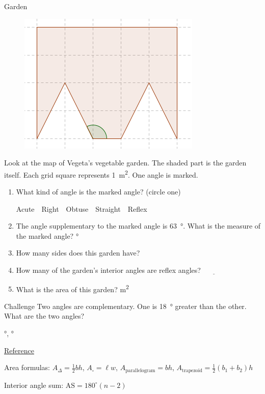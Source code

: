 \documentclass[12pt,letterpaper]{article}
\begin{document}
\begin{problem}{Garden}
\begin{figure}[h]
  \begin{center}
    \includegraphics[width=.4\textwidth]{garden.png}
  \end{center}
\end{figure}

 Look at the map of Vegeta's vegetable garden. The shaded part is the
 garden itself. Each grid square represents \SI{1}{\meter^2}. One angle is marked.

 \begin{enumerate}
  \item What kind of angle is the marked angle? (circle one)

  \hfill Acute~~Right~~Obtuse~~Straight~~Reflex

  \item The angle supplementary to the marked angle is \SI{63}{\degree}.
  What is the measure of the marked angle?
  \hfill \blankC \si{\degree}

  \item How many sides does this garden have? \hfill \blankC

  \item How many of the garden's interior angles are reflex angles?
  \hfill $\underline{\hspace{3em}}$

  \item What is the area of this garden? \hfill \blankC \si{\meter^2}
\end{enumerate}

\end{problem}

\begin{problem}{Challenge}
 Two angles are complementary. One is \SI{18}{\degree} greater than the other.
 What are the two angles?

 \hfill \blankC \si{\degree}, \blankC \si{\degree}
\end{problem}

\vspace{1em}\noindent\underline{Reference}

\noindent Area formulas: $A_\Delta=\frac{1}{2}bh$, $A_\square=\ell w$,
$A_\text{parallelogram}=bh$,
$A_\text{trapezoid}=\frac{1}{2}\left(b_1+b_2\right)h$

\noindent Interior angle sum: $\mathrm{AS}=180^\circ (n-2)$
\end{document}
